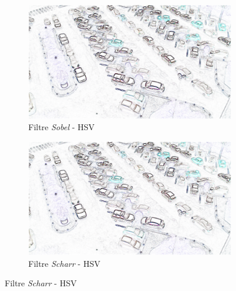 \begin{figure}[H]
    \bigskip
    \begin{subfigure}{.5\textwidth}
        \centering
        \includegraphics[width=.85\linewidth]{img/conception/image_process/downsample-edge/1.png}
        \caption{Filtre \textit{Sobel} - HSV}   
    \end{subfigure}%
    \begin{subfigure}{.5\textwidth}
        \centering
        \includegraphics[width=.85\linewidth]{img/conception/image_process/downsample-edge/4.png}
        \caption{Filtre \textit{Scharr} - HSV}
    \end{subfigure}%
    

\end{figure}
